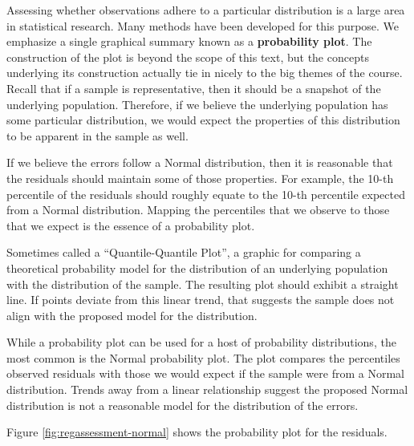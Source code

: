 \documentclass[]{book}
\theoremstyle{plain}
\theoremstyle{mydefn}
\theoremstyle{myexmpl}
\theoremstyle{remark}
\let\BeginKnitrBlock\begin \let\EndKnitrBlock\end
\let\BeginKnitrBlock\begin \let\EndKnitrBlock\end
\begin{document}
Assessing whether observations adhere to a particular distribution is a
large area in statistical research. Many methods have been developed for
this purpose. We emphasize a single graphical summary known as a
\textbf{probability plot}. The construction of the plot is beyond the
scope of this text, but the concepts underlying its construction
actually tie in nicely to the big themes of the course. Recall that if a
sample is representative, then it should be a snapshot of the underlying
population. Therefore, if we believe the underlying population has some
particular distribution, we would expect the properties of this
distribution to be apparent in the sample as well.

If we believe the errors follow a Normal distribution, then it is
reasonable that the residuals should maintain some of those properties.
For example, the 10-th percentile of the residuals should roughly equate
to the 10-th percentile expected from a Normal distribution. Mapping the
percentiles that we observe to those that we expect is the essence of a
probability plot.

\BeginKnitrBlock{definition}[Probability Plot]
\protect\hypertarget{def:defn-probability-plot}{}{\label{def:defn-probability-plot}
{} }Sometimes called a
``Quantile-Quantile Plot'', a graphic for comparing a theoretical
probability model for the distribution of an underlying population with
the distribution of the sample. The resulting plot should exhibit a
straight line. If points deviate from this linear trend, that suggests
the sample does not align with the proposed model for the distribution.
\EndKnitrBlock{definition}

While a probability plot can be used for a host of probability
distributions, the most common is the Normal probability plot. The plot
compares the percentiles observed residuals with those we would expect
if the sample were from a Normal distribution. Trends away from a linear
relationship suggest the proposed Normal distribution is not a
reasonable model for the distribution of the errors.

Figure \ref{fig:regassessment-normal} shows the probability plot for the
residuals.
\end{document}
